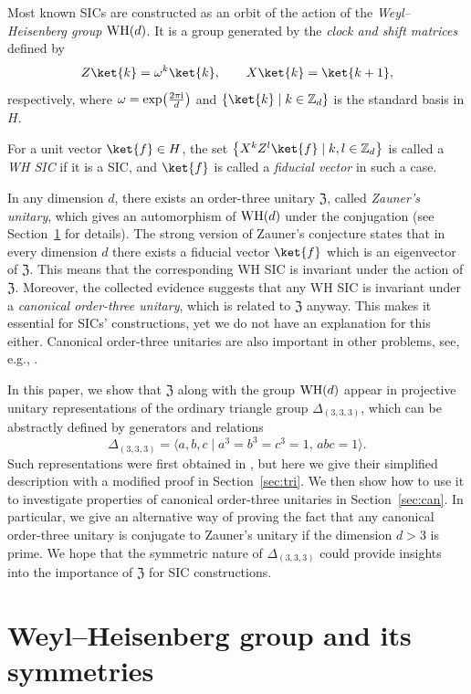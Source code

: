 \documentclass[pdftex]{sigma}
\numberwithin{equation}{section}
\newcommand{\la}{\langle}
\newcommand{\ra}{\rangle}
\newcommand{\mbb}{\mathbb}
\begin{document}
Most known SICs are constructed as an orbit of the action
of the \textit{Weyl--Heisenberg group} ${\rm WH}(d)$.
It is a group generated by the \textit{clock and shift matrices} defined by
\[
Z\ket{k} = \omega^k \ket{k},
\qquad X\ket{k} = \ket{k+1},
\]
respectively, where $\omega = \exp \bigl(\frac{2\pi {\rm i}}{d}\bigr)$
and $\{\ket{k} \mid  k \in \mbb{Z}_d\}$ is the standard basis in $H$.

For a unit vector $\ket{f} \in H$, the set $\bigl\{ X^kZ^l\ket{f} \mid k,l \in \mbb{Z}_d\bigr\}$ is called a
\textit{WH SIC} if it is a SIC, and $\ket{f}$ is called a \textit{fiducial vector} in such a case.

In any dimension $d$, there exists an order-three unitary $\mathfrak{Z}$, called \textit{Zauner's unitary},
which gives an automorphism of ${\rm WH}(d)$ under the conjugation (see Section~\ref{sec:wh} for details).
The strong version of Zauner's conjecture states that in every dimension $d$ there exists
a fiducial vector $\ket{f}$ which is an eigenvector of $\mathfrak{Z}$.
This means that the corresponding WH SIC is invariant under the action of $\mathfrak{Z}$.
Moreover, the collected evidence suggests that any WH SIC is invariant under a
\textit{canonical order-three unitary}, which is related to $\mathfrak{Z}$ anyway.
This makes it essential for SICs' constructions, yet we do not have an explanation for this either.
Canonical order-three unitaries are also important in other problems, see, e.g., \cite{BBCH}.

In this paper, we show that $\mathfrak{Z}$ along with the group ${\rm WH}(d)$
appear in projective unitary representations of the ordinary triangle group $\Delta_{(3,3,3)}$,
which can be abstractly defined by generators and relations
\[
\Delta_{(3,3,3)} = \big\la a,b,c \mid a^3=b^3=c^3=1,\,  abc=1\big\ra.
\]
Such representations were first obtained in \cite{RL},
but here we give their simplified description with a modified proof in Section~\ref{sec:tri}.
We then show how to use it to investigate properties of canonical order-three unitaries
in Section~\ref{sec:can}. In particular, we give an alternative way of proving the fact that any
canonical order-three unitary is conjugate to Zauner's unitary if the dimension $d>3$ is prime.
We hope that the symmetric nature of
$\Delta_{(3,3,3)}$ could provide insights into the importance of $\mathfrak{Z}$ for SIC constructions.

\section{Weyl--Heisenberg group and its symmetries}\label{sec:wh}
\end{document}
